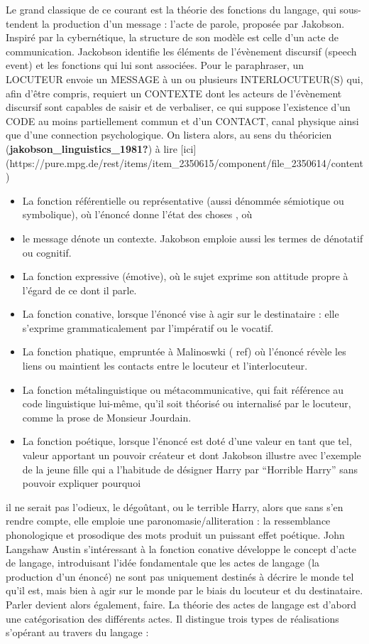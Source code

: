 \documentclass[
  letterpaper,
  DIV=11,
  numbers=noendperiod]{scrreprt}
\begin{document}
Le grand classique de ce courant est la théorie des fonctions du
langage, qui sous-tendent la production d'un message : l'acte de parole,
proposée par Jakobson. Inspiré par la cybernétique, la structure de son
modèle est celle d'un acte de communication. Jackobson identifie les
éléments de l'évènement discursif (speech event) et les fonctions qui
lui sont associées. Pour le paraphraser, un LOCUTEUR envoie un MESSAGE à
un ou plusieurs INTERLOCUTEUR(S) qui, afin d'être compris, requiert un
CONTEXTE dont les acteurs de l'évènement discursif sont capables de
saisir et de verbaliser, ce qui suppose l'existence d'un CODE au moins
partiellement commun et d'un CONTACT, canal physique ainsi que d'une
connection psychologique. On listera alors, au sens du théoricien
(\textbf{jakobson\_linguistics\_1981?}) à lire
{[}ici{]}(https://pure.mpg.de/rest/items/item\_2350615/component/file\_2350614/content)

\begin{itemize}
\item
  La fonction référentielle ou représentative (aussi dénommée sémiotique
  ou symbolique), où l'énoncé donne l'état des choses , où
\item
  le message dénote un contexte. Jakobson emploie aussi les termes de
  dénotatif ou cognitif.
\item
  La fonction expressive (émotive), où le sujet exprime son attitude
  propre à l'égard de ce dont il parle.
\item
  La fonction conative, lorsque l'énoncé vise à agir sur le destinataire
  : elle s'exprime grammaticalement par l'impératif ou le vocatif.
\item
  La fonction phatique, empruntée à Malinoswki ( ref) où l'énoncé révèle
  les liens ou maintient les contacts entre le locuteur et
  l'interlocuteur.
\item
  La fonction métalinguistique ou métacommunicative, qui fait référence
  au code linguistique lui-même, qu'il soit théorisé ou internalisé par
  le locuteur, comme la prose de Monsieur Jourdain.
\item
  La fonction poétique, lorsque l'énoncé est doté d'une valeur en tant
  que tel, valeur apportant un pouvoir créateur et dont Jakobson
  illustre avec l'exemple de la jeune fille qui a l'habitude de désigner
  Harry par ``Horrible Harry'' sans pouvoir expliquer pourquoi
\end{itemize}

il ne serait pas l'odieux, le dégoûtant, ou le terrible Harry, alors que
sans s'en rendre compte, elle emploie une paronomasie/alliteration : la
ressemblance phonologique et prosodique des mots produit un puissant
effet poétique. John Langshaw Austin s'intéressant à la fonction
conative développe le concept d'acte de langage, introduisant l'idée
fondamentale que les actes de langage (la production d'un énoncé) ne
sont pas uniquement destinés à décrire le monde tel qu'il est, mais bien
à agir sur le monde par le biais du locuteur et du destinataire. Parler
devient alors également, faire. La théorie des actes de langage est
d'abord une catégorisation des différents actes. Il distingue trois
types de réalisations s'opérant au travers du langage :
\end{document}

